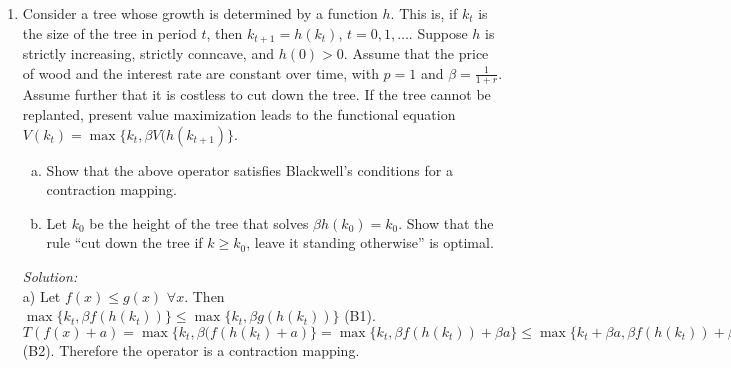 \documentclass[12pt]{article}
\newif\ifsln
\begin{document}
\begin{enumerate}[1.]
\begin{align*}
\ &\eta[\bar{Y} - \delta \bar{K}] = (1-\bar{\ell})(1-\alpha) \frac{\bar{Y}}{\bar{\ell}}\\
\therefore \ & \eta[1 - \delta \frac{\bar{K}}{\bar{Y}}]\bar{\ell} = (1-\bar{\ell})(1-\alpha)\\
\therefore\ & \bar{\ell} \left(1 + \frac{\eta}{1-\alpha}[1 - \delta \frac{\bar{K}}{\bar{Y}}]\right) = 1\\
\therefore\ & \bar{\ell} = \frac{1}{1 + \left(\frac{\eta}{1-\alpha}\right) \left[1 - \delta \frac{\bar{K}}{\bar{Y}}\right]}\\
\end{align*}

Noting that $\frac{\bar{k}}{\bar{Y}} = \frac{1}{A \bar{k}^{\alpha -1}\bar{l}^{1-\alpha}} = \frac{1}{A \left(\bar{\ell} \left[\frac{\alpha\beta A}{1 - \beta(1-\delta)} \right]^{\frac{1}{1-\alpha}}\right)^{\alpha -1}\bar{l}^{1-\alpha}} = \frac{\alpha \beta}{1 - \beta(1-\delta)}$ finishes it.
\fi
\item Consider a tree whose growth is determined by a function $h$. This is, if $k_{t}$ is the size of the tree in period $t$, then $k_{t+1} = h(k_{t})$, $t=0, 1, \dots$. Suppose $h$ is strictly increasing, strictly conncave, and $h(0) > 0$. Assume that the price of wood and the interest rate are constant over time, with $p = 1$ and $\beta = \frac{1}{1+r}$. Assume further that it is costless to cut down the tree. If the tree cannot be replanted, present value maximization leads to the functional equation $V(k_{t}) = \max\{k_{t}, \beta V(h(k_{t+1})\}$.

\begin{enumerate}[a)]
	\item Show that the above operator satisfies Blackwell's conditions for a contraction mapping.
	\item Let $k_{0}$ be the height of the tree that solves $\beta h(k_{0}) = k_{0}$. Show that the rule ``cut down the tree if $k \geq k_{0}$, leave it standing otherwise'' is optimal.
\end{enumerate}


\ifsln
\textit{Solution:}\\
a) Let $f(x) \leq g(x)$ $\forall x$. Then $\max\{k_{t}, \beta f(h(k_{t}))\} \leq \max\{k_{t}, \beta g(h(k_{t}))\}$ (B1). $T(f(x) + a) = \max\{k_{t}, \beta(f(h(k_{t}) + a)\} = \max\{k_{t}, \beta f(h(k_{t})) + \beta a\} \leq \max\{k_{t}+\beta a, \beta f(h(k_{t})) + \beta a\} = \max\{k_{t}, \beta f(h(k_{t}))\} + \beta a = T(f) + \beta a$ (B2). Therefore the operator is a contraction mapping.\medskip


\end{enumerate}
\end{document}
